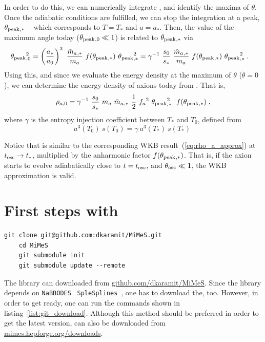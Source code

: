 \documentclass[11pt,a4paper]{article}
\begin{document}
In order to do this, we can numerically integrate , and identify the maxima of $\theta$. Once the adiabatic conditions are fulfilled, we can stop the integration at a peak, $\theta_{\rm peak}{}_{,*}$ -- which corresponds to $T=T_{*}$ and $a=a_{*}$. Then, the value of the maximum angle today ($\theta_{\rm peak}{}_{,0} \ll 1$) is related to $\theta_{\rm peak}{}_{,*}$ via
%
\begin{eqnarray}
	\thetamax_{,0}^2 &=  \lrb{\dfrac{a_*}{a_0}}^3 \ \dfrac{\maT_{,*}}{\ma} \ f(\thetamax_{,*}) \ \thetamax_{,*}^2  =
	\gamma^{-1} \ \dfrac{s_0}{s_*} \ \dfrac{\maT_{,*}}{\ma} \ f(\thetamax_{,*}) \ \thetamax_{,*}^2 
	\; .
	\label{eq:theta_relation}
\end{eqnarray}
%
Using this, and since we evaluate the energy density at the maximum of $\theta$ (\ie $\dot \theta = 0$), we can determine the energy density of axions today from . That is,
%
\begin{equation}
	\rho_{a,0} = \gamma^{-1} \ \dfrac{s_0}{s_*} \ \ma \ \maT_{,*} \ \dfrac{1}{2} \ \fa^2 \ \thetamax_{,*}^2 \;  \ f(\thetamax_{,*}) \;,
	\label{eq:rho_axion_exact}
\end{equation}
%
where $\gamma$ is the entropy injection coefficient between $T_{*}$ and $T_0$, defined from 
%
\begin{equation}
	a^3(T_0) \ s(T_0) = \gamma \ a^3(T_*) \ s(T_*) \;
	\label{eq:entropy_injection_gamma}
\end{equation}

Notice that  is similar to the corresponding WKB result~(\ref{eq:rho_a_approx}) at $t_{\rm osc}{} \to t_*$, multiplied by the anharmonic factor $f(\theta_{\rm peak}{}_{,*})$. That is, if the axion starts to evolve adiabatically close to $t=t_{\rm osc}{}$, and $\theta_{\rm osc}{} \ll 1$, the WKB approximation is valid.



\section{First steps with \mimes}\label{sec:first_steps}
\setcounter{equation}{0}
%
\begin{lstlisting}[caption={Commands in order to download \mimes, the differential equation solvers, and the interpolation libraries.},captionpos=b, label=list:git_download]
	git clone git@github.com:dkaramit/MiMeS.git
	cd MiMeS
	git submodule init
	git submodule update --remote
\end{lstlisting}
%
The library can downloaded from \href{https:/github.com/dkaramit/MiMeS}{github.com/dkaramit/MiMeS}. Since the library depends on {\tt NaBBODES}~\cite{NaBBODES} {\tt SpleSplines}~\cite{SimpleSplines}, one has to download the, too. However, in order to get \mimes ready, one can run the commands shown in listing~\ref{list:git_download}. Although this method should be preferred in order to get the latest version, \mimes can also be downloaded from \href{https:/mimes.hepforge.org/downloads/}{mimes.hepforge.org/downloads}.
\end{document}
